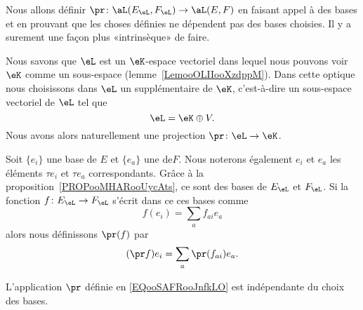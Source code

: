 \begin{probleme}
    Nous allons définir \( \pr\colon \aL(E_{\eL},F_{\eL})\to \aL(E,F)\) en faisant appel à des bases et en prouvant que les choses définies ne dépendent pas des bases choisies. Il y a surement une façon plus «intrinsèque» de faire.
\end{probleme}


Nous savons que \( \eL\) est un \( \eK\)-espace vectoriel dans lequel nous pouvons voir \( \eK\) comme un sous-espace (lemme~\ref{LemooOLIIooXzdppM}). Dans cette optique nous choisissons dans \( \eL\) un supplémentaire de \( \eK\), c'est-à-dire un sous-espace vectoriel de \( \eL\) tel que
\begin{equation}
    \eL=\eK\oplus V.
\end{equation}
Nous avons alors naturellement une projection \( \pr\colon \eL\to \eK\).

Soit \( \{ e_i \}\) une base de \( E \) et \(\{ e_a \}\) une  de\( F\). Nous noterons également \( e_i\) et \( e_a\) les éléments \( \tau e_i\) et \( \tau e_a\) correspondants. Grâce à la proposition~\ref{PROPooMHARooUycAts}, ce sont des bases de \( E_{\eL}\) et \( F_{\eL}\). Si la fonction \( f\colon E_{\eL}\to F_{\eL}\) s'écrit dans ce ces bases comme
\begin{equation}
    f(e_i)=\sum_af_{ai}e_a
\end{equation}
alors nous définissons \( \pr(f)\) par
\begin{equation}        \label{EQooSAFRooJnfkLO}
    (\pr f)e_i=\sum_a\pr(f_{ai})e_a.
\end{equation}

\begin{proposition}      \label{PROPooOEHTooHyjuZQ}
    L'application \( \pr\) définie en \eqref{EQooSAFRooJnfkLO} est indépendante du choix des bases.
\end{proposition}

